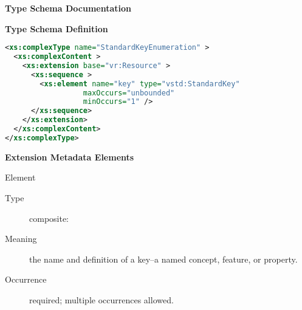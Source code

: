 \documentclass[11pt,a4paper]{ivoa}
\begin{document}
\begin{generated}
\begingroup
        \renewcommand*\descriptionlabel[1]{%
        \hbox to 5.5em{\emph{#1}\hfil}}\vspace{2ex}\noindent\textbf{ Type Schema Documentation}


\vspace{1ex}\noindent\textbf{ Type Schema Definition}

\begin{lstlisting}[language=XML,basicstyle=\footnotesize]
<xs:complexType name="StandardKeyEnumeration" >
  <xs:complexContent >
    <xs:extension base="vr:Resource" >
      <xs:sequence >
        <xs:element name="key" type="vstd:StandardKey"
                  maxOccurs="unbounded"
                  minOccurs="1" />
      </xs:sequence>
    </xs:extension>
  </xs:complexContent>
</xs:complexType>
\end{lstlisting}

\vspace{0.5ex}\noindent\textbf{ Extension Metadata Elements}

\begingroup\small\begin{bigdescription}\item[Element \xmlel{key}]
\begin{description}
\item[Type] composite: 
\item[Meaning] 
                      the name and definition of a key--a named concept, 
                      feature, or property.
                    
\item[Occurrence] required; multiple occurrences allowed.

\end{description}


\end{bigdescription}\endgroup

\endgroup
\end{generated}
\end{document}
